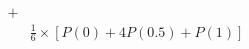 \documentclass[preview]{standalone}
\begin{document}
\begin{align*}
+&\\&\frac{1}{6}\times[P(0)+4P(0.5)+P(1)]
\end{align*}
\end{document}
